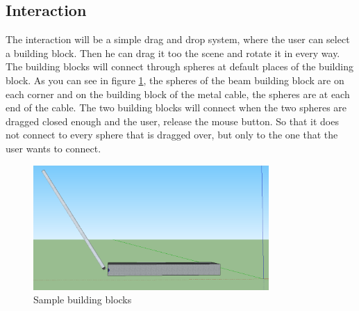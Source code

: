 \documentclass[10pt]{article}
\begin{document}
\subsection{Interaction}
The interaction will be a simple drag and drop system, where the user can select a building block. Then he can drag it too the scene and rotate it in every way. The building blocks will connect through spheres at default places of the building block. As you can see in figure \ref{fig:sbb}, the spheres of the beam building block are on each corner and on the building block of the metal cable, the spheres are at each end of the cable. The two building blocks will connect when the two spheres are dragged closed enough and the user, release the mouse button. So that it does not connect to every sphere that is dragged over, but only to the one that the user wants to connect. 
\begin{figure}[H]
    \centering
    \includegraphics[width=0.8\textwidth]{pics/Spheresbuildingblocks.png}
    \caption{Sample building blocks}
    \label{fig:sbb}
\end{figure}
\end{document}
